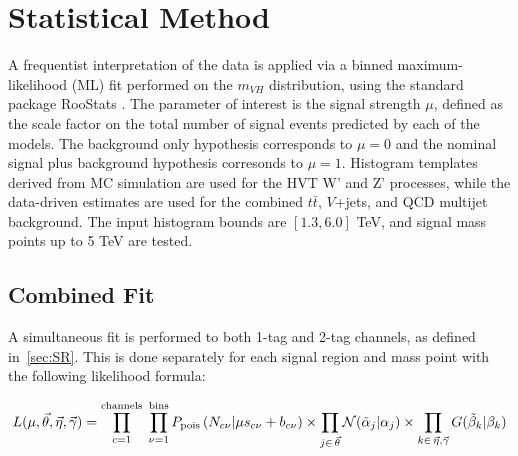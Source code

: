 \section{Statistical Method}
\label{sec:statistics}

A frequentist interpretation of the data is applied via a binned maximum-likelihood (ML) fit performed on the $m_{VH}$ distribution, using the standard package RooStats \cite{Roostats}.
The parameter of interest is the signal strength $\mu$, defined as the scale factor on the total number of signal events predicted by each of the models.
The background only hypothesis corresponds to $\mu = 0$ and the nominal signal plus background hypothesis corresonds to $\mu = 1$.
Histogram templates derived from MC simulation are used for the HVT W' and Z' processes, while the data-driven estimates are used for the combined $t\bar{t}$, $V$+jets, and QCD multijet background.
The input histogram bounds are $[1.3, 6.0]$ TeV, and signal mass points up to 5 TeV are tested.

\subsection{Combined Fit}
\label{sec:combined_fit}
A simultaneous fit is performed to both 1-tag and 2-tag channels, as defined in~\ref{sec:SR}.
This is done separately for each signal region and mass point with the following likelihood formula:

\begin{equation}
L(\mu, \vec{\theta}, \vec{\eta}, \vec{\gamma}) =
\prod_{c=1}^{\mathrm{channels}}\; \prod_{\nu=1}^{\mathrm{bins}}
P_{\mathrm{pois}}\left(N_{c\nu} | \mu s_{c\nu} + b_{c\nu}\right)
\times
\prod_{j \in\,\vec{\theta}} \mathcal{N}(\tilde{\alpha}_{j} | \alpha_{j})
\times
\prod_{k \in\,\vec{\eta}, \vec{\gamma}} \mathnormal{G}(\tilde{\beta}_{k} | \beta_{k})
\end{equation}

